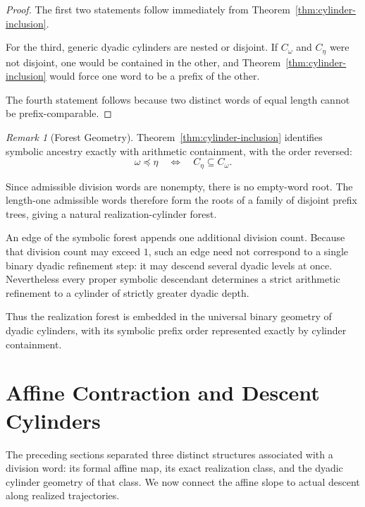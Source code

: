 \documentclass[12pt, oneside]{article}
\numberwithin{equation}{section}
\theoremstyle{definition}
\theoremstyle{plain}
\theoremstyle{remark}
\newtheorem*{remark}{Remark}
\begin{document}
\begin{proof}
The first two statements follow immediately from
Theorem~\ref{thm:cylinder-inclusion}.

For the third, generic dyadic cylinders are nested or disjoint. If
\(C_\omega\) and \(C_\eta\) were not disjoint, one would be contained in
the other, and Theorem~\ref{thm:cylinder-inclusion} would force one word
to be a prefix of the other.

The fourth statement follows because two distinct words of equal length
cannot be prefix-comparable.
\end{proof}

\begin{remark}[Forest Geometry]
Theorem~\ref{thm:cylinder-inclusion} identifies symbolic ancestry exactly
with arithmetic containment, with the order reversed:
\[
\omega\preceq\eta
\quad\Longleftrightarrow\quad
C_\eta\subseteq C_\omega.
\]

Since admissible division words are nonempty, there is no empty-word root.
The length-one admissible words therefore form the roots of a family of
disjoint prefix trees, giving a natural realization-cylinder forest.

An edge of the symbolic forest appends one additional division count.
Because that division count may exceed \(1\), such an edge need not
correspond to a single binary dyadic refinement step: it may descend
several dyadic levels at once. Nevertheless every proper symbolic
descendant determines a strict arithmetic refinement to a cylinder of
strictly greater dyadic depth.

Thus the realization forest is embedded in the universal binary geometry
of dyadic cylinders, with its symbolic prefix order represented exactly
by cylinder containment.
\end{remark}


\section{Affine Contraction and Descent Cylinders}
\label{sec:affine-contraction-descent}

The preceding sections separated three distinct structures associated with
a division word: its formal affine map, its exact realization class, and
the dyadic cylinder geometry of that class. We now connect the affine
slope to actual descent along realized trajectories.
\end{document}
